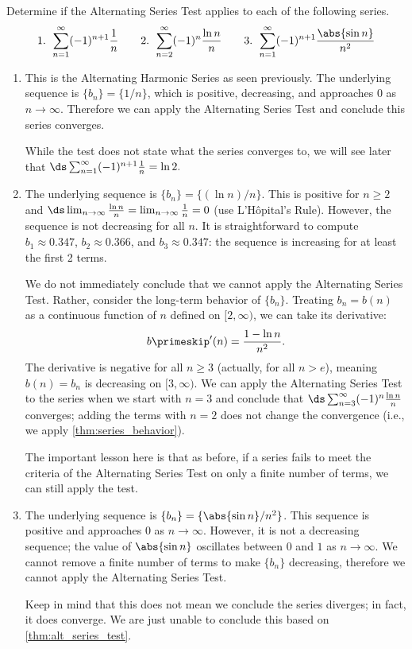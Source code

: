 \begin{example}\label{ex_alt1}%
Determine if the Alternating Series Test applies to each of the following series.
\[
 \text{1. }\sum_{n=1}^\infty (-1)^{n+1}\frac1n\qquad
 \text{2. }\sum_{n=2}^\infty (-1)^n\frac{\ln n}{n}\qquad
 \text{3. }\sum_{n=1}^\infty (-1)^{n+1}\frac{\abs{\sin n}}{n^2}
\]
\solution
\begin{enumerate}
	\item This is the Alternating Harmonic Series as seen previously. The underlying sequence is $\{b_n\} = \{1/n\}$, which is positive, decreasing, and approaches 0 as $n\to\infty$. Therefore we can apply the Alternating Series Test and conclude this series converges. 
	
	While the test does not state what the series converges to, we will see later that $\ds \sum_{n=1}^\infty (-1)^{n+1}\frac1n=\ln2.$
	
	\item		The underlying sequence is $\{b_n\} = \{(\ln n)/n\}$. This is positive for $n\geq 2$ and $\ds \lim_{n\to \infty} \frac{\ln n}{n}=\lim_{n\to \infty}\frac{1}{n}=0$ (use L'Hôpital's Rule). However, the sequence is not decreasing for all $n$. It is straightforward to compute $b_1\approx0.347$, $b_2\approx 0.366$, and $b_3\approx 0.347$: the sequence is increasing for at least the first 2 terms. 
	
	We do not immediately conclude that we cannot apply the Alternating Series Test. Rather, consider the long-term behavior of $\{b_n\}$. Treating $b_n=b(n)$ as a continuous function of $n$ defined on $[2,\infty)$, we can take its derivative:
	\[b\primeskip'(n) = \frac{1-\ln n}{n^2}.\]
	The derivative is negative for all $n\geq 3$ (actually, for all $n>e$), meaning $b(n)=b_n$ is decreasing on $[3,\infty)$. We can apply the Alternating Series Test to the series when we start with $n=3$ and conclude that $\ds \sum_{n=3}^\infty(-1)^n\frac{\ln n}{n}$ converges; adding the terms with $n=2$ does not change the convergence (i.e., we apply \autoref{thm:series_behavior}).
	
	The important lesson here is that as before, if a series fails to meet the criteria of the Alternating Series Test on only a finite number of terms, we can still apply the test.
	
	\item  The underlying sequence is $\{b_n\} = \{\abs{\sin n}/n^2\}$. This sequence is positive and approaches $0$ as $n\to\infty$. However, it is not a decreasing sequence; the value of $\abs{\sin n}$ oscillates between $0$ and $1$ as $n\to\infty$. We cannot remove a finite number of terms to make $\{b_n\}$ decreasing, therefore we cannot apply the Alternating Series Test.
	
	Keep in mind that this does not mean we conclude the series diverges; in fact, it does converge. We are just unable to conclude this based on \autoref{thm:alt_series_test}.
\end{enumerate}
\end{example}

